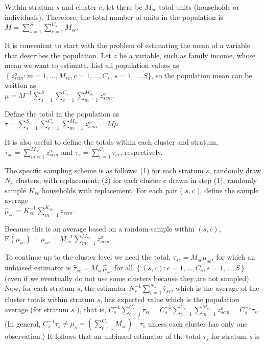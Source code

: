 \documentclass[10pt]{article}
\begin{document}
Within stratum $s$ and cluster $c$, let there be $M_{s c}$ total units (households or individuals). Therefore, the total number of units in the population is\\
$M=\sum_{s=1}^{S} \sum_{c=1}^{C_{s}} M_{s c}$.

It is convenient to start with the problem of estimating the mean of a variable that describes the population. Let $z$ be a variable, such as family income, whose mean we want to estimate. List all population values as $\left\{z_{s c m}^{o}: m=1, \ldots, M_{s c}, c=1, \ldots, C_{s}\right.$, $s=1, \ldots, S\}$, so the population mean can be written as\\
$\mu=M^{-1} \sum_{s=1}^{S} \sum_{c=1}^{C_{s}} \sum_{m=1}^{M_{s c}} z_{s c m}^{o}$.

Define the total in the population as\\
$\tau=\sum_{s=1}^{S} \sum_{c=1}^{C_{s}} \sum_{m=1}^{M_{s c}} z_{s c m}^{o}=M \mu$.

It is also useful to define the totals within each cluster and stratum, $\tau_{s c}=\sum_{m=1}^{M_{s c}} z_{s c m}^{o}$ and $\tau_{s}=\sum_{c=1}^{C_{s}} \tau_{s c}$, respectively.

The specific sampling scheme is as follows: (1) for each stratum $s$, randomly draw $N_{s}$ clusters, with replacement; (2) for each cluster $c$ drawn in step (1), randomly sample $K_{s c}$ households with replacement. For each pair ( $s, c$ ), define the sample average\\
$\hat{\mu}_{s c}=K_{s c}^{-1} \sum_{m=1}^{K_{s c}} z_{s c m}$.

Because this is an average based on a random sample within $(s, c)$,\\
$\mathrm{E}\left(\hat{\mu}_{s c}\right)=\mu_{s c}=M_{s c}^{-1} \sum_{m=1}^{M_{s c}} z_{s c m}^{o}$.

To continue up to the cluster level we need the total, $\tau_{s c}=M_{s c} \mu_{s c}$, for which an unbiased estimator is $\hat{\tau}_{s c}=M_{s c} \hat{\mu}_{s c}$ for all $\left\{(s, c): c=1, \ldots, C_{s}, s=1, \ldots, S\right\}$ (even if we eventually do not use some clusters because they are not sampled). Now, for each stratum $s$, the estimator $N_{s}^{-1} \sum_{c=1}^{N_{s}} \hat{\tau}_{s c}$, which is the average of the cluster totals within stratum $s$, has expected value which is the population average (for stratum $s$ ), that is, $C_{s}^{-1} \sum_{c=1}^{C_{s}} \tau_{s c}=C_{s}^{-1} \sum_{c=1}^{C_{s}} \sum_{m=1}^{M_{s c}} z_{s c m}^{o}=C_{s}^{-1} \tau_{s}$. (In general, $C_{s}^{-1} \tau_{s} \neq \mu_{s}= \left(\sum_{c=1}^{C_{s}} M_{s c}\right)^{-1} \tau_{s}$ unless each cluster has only one observation.) It follows that an unbiased estimator of the total $\tau_{s}$ for stratum $s$ is
\end{document}
